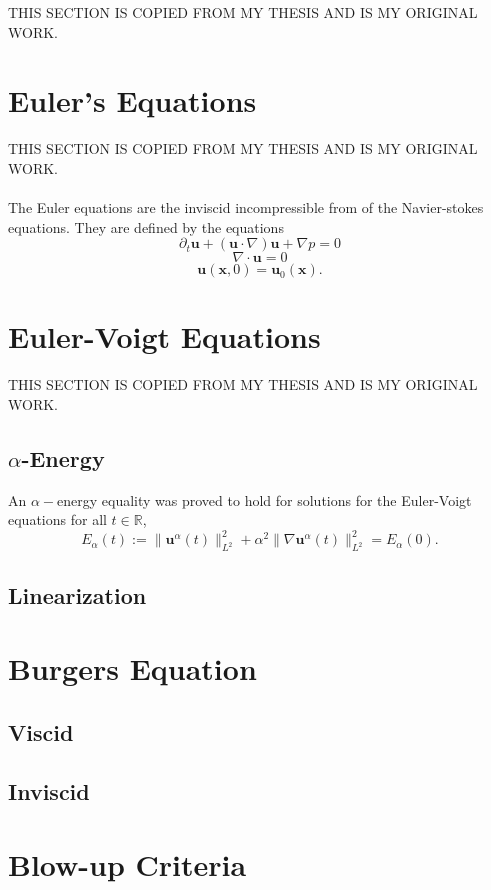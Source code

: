 \documentclass[12pt]{article}
\begin{document}
\begin{flushleft}
THIS SECTION IS COPIED FROM MY THESIS AND IS MY ORIGINAL WORK.
 
\section{Euler's Equations}
THIS SECTION IS COPIED FROM MY THESIS AND IS MY ORIGINAL WORK.
\\~\\
The Euler equations are the inviscid incompressible from of the Navier-stokes equations. They are defined by the equations
$$\partial_t\textbf{u}+(\textbf{u}\cdot\nabla)\textbf{u}+\nabla p = 0$$
$$\nabla \cdot \textbf{u} = 0$$
$$\textbf{u}(\textbf{x},0) = \textbf{u}_0(\textbf{x}).$$

\section{Euler-Voigt Equations}

THIS SECTION IS COPIED FROM MY THESIS AND IS MY ORIGINAL WORK.

\subsection{$\alpha$-Energy}

An $\alpha-$energy equality was proved to hold for solutions for the Euler-Voigt equations for all $t\in \mathbb{R}$,
$$E_\alpha(t) := \|\textbf{u}^\alpha(t)\|_{L^2}^2 + \alpha^2\|\nabla \textbf{u}^\alpha (t)\|_{L^2}^2 = E_\alpha (0).$$

\subsection{Linearization}

\section{Burgers Equation}
\subsection{Viscid}
\subsection{Inviscid}

\section{Blow-up Criteria}


\end{flushleft}
\end{document}
